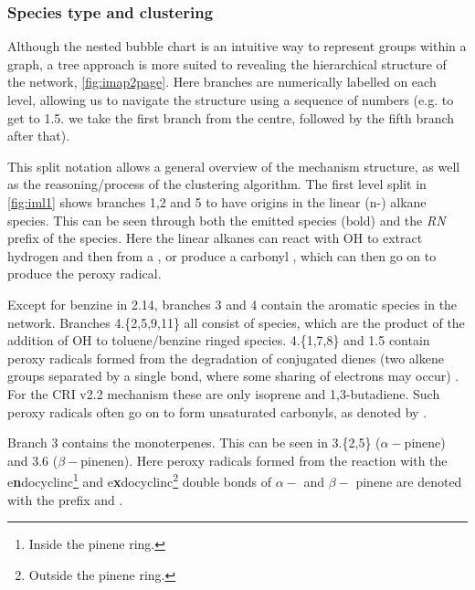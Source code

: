 

\subsubsection{Species type and clustering}
Although the nested bubble chart is an intuitive way to represent groups within a graph, a tree approach is more suited to revealing the hierarchical structure of the network, \autoref{fig:imap2page}. Here branches are numerically labelled on each level, allowing us to navigate the structure using a sequence of numbers (e.g. to get to 1.5. we take the first branch from the centre, followed by the fifth branch after that).

This split notation allows a general overview of the mechanism structure, as well as the reasoning/process of the clustering algorithm. The first level split in \autoref{fig:iml1} shows branches 1,2 and 5 to have origins in the linear (n-) alkane species. This can be seen through both the emitted species (bold) and the \emph{RN} prefix of the species. Here the linear alkanes can react with OH to extract hydrogen and then from a , or produce a carbonyl \emph{}, which can then go on to produce the \emph{} peroxy radical.

Except for benzine in 2.14, branches 3 and 4 contain the aromatic species in the network.  Branches 4.\{2,5,9,11\} all consist of \emph{} species, which are the product of the addition of OH to toluene/benzine ringed species. 4.\{1,7,8\} and 1.5 contain peroxy radicals formed from the degradation of conjugated dienes (two alkene groups separated by a single bond, where some sharing of electrons may occur) \emph{}. For the CRI v2.2 mechanism these are only isoprene and 1,3-butadiene. Such peroxy radicals often go on to form unsaturated carbonyls, as denoted by \emph{}.

Branch 3 contains the monoterpenes. This can be seen in 3.\{2,5\} ($\alpha-$pinene) and 3.6 ($\beta-$pinenen). Here peroxy radicals formed from the reaction with the e\textbf{n}docyclinc\footnote{Inside the pinene ring.} and e\textbf{x}docyclinc\footnote{Outside the pinene ring.} double bonds of $\alpha-$ and $\beta-$ pinene are denoted with the prefix \emph{} and \emph{}.

